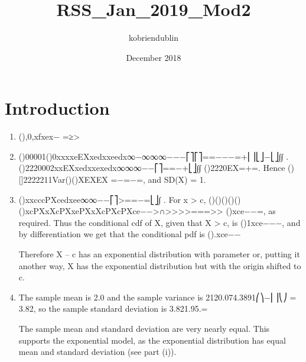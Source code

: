 \documentclass{article}
\title{RSS_Jan_2019_Mod2}
\author{kobriendublin }
\date{December 2018}
\begin{document}
\section{Introduction}

\begin{enumerate}
    \item 

(),0,xfxex\lambda\lambda\lambda− =≥>
\item  ()00001()0xxxxeEXxedxxeedx\lambda\lambda\lambda\lambda\lambda\lambda\lambda∞−∞∞∞−−−⎡⎤⎡⎤==−−−=+⎢⎥⎣⎦−⎣⎦∫∫ .
()2220002xxEXxedxxexedx\lambda\lambda\lambda∞∞∞−−⎡⎤==−+⎣⎦∫∫
()2220EX\lambda\lambda=+=.
Hence ()[]2222211Var()()XEXEX \lambda\lambda\lambda=−=−=, and SD(X) = 1.\lambda
\item  ()xxcccPXcedxee\lambda\lambda\lambda\lambda∞∞−−⎡⎤>==−=⎣⎦∫ .
For x > c, ()()(){}()()()xcPXxXcPXxePXxXcPXcPXce\lambda\lambda−−>∩>>>>===>>
()xce\lambda−−=, as required.
Thus the conditional cdf of X, given that X > c, is ()1xce\lambda−−−, and by differentiation we get that the conditional pdf is ().xce\lambda\lambda−−

Therefore X – c has an exponential distribution with parameter \lambda or, putting it another way, X has the exponential distribution but with the origin shifted to c.
\item  The sample mean is 2.0 and the sample variance is 2120.074.3891⎛⎞−⎜⎟⎝⎠ = 3.82, so the sample standard deviation is 3.821.95.=

The sample mean and standard deviation are very nearly equal. This supports the exponential model, as the exponential distribution has equal mean and standard deviation (see part (i)).
\end{enumerate}
\end{document}
